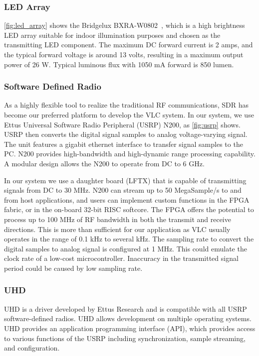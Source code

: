 \subsubsection{LED Array}
\autoref{fig:led_array} shows the Bridgelux BXRA-W0802~\cite{Bridgelux}, which is a high brightness LED array suitable for indoor illumination purposes and chosen as the transmitting LED component. The maximum DC forward current is 2 amps, and the typical forward voltage is around 13 volts, resulting in a maximum output power of 26 W. Typical luminous flux with 1050 mA forward is 850 lumen.

\subsubsection{Software Defined Radio}
As a highly flexible tool to realize the traditional RF communications, SDR has become our preferred platform to develop the VLC system. In our system, we use Ettus Universal Software Radio Peripheral (USRP) N200, as \autoref{fig:usrp} shows. USRP then converts the digital signal samples to analog voltage-varying signal.
The unit features a gigabit ethernet interface to transfer signal samples to the PC. 
N200 provides high-bandwidth and high-dynamic range processing capability. 
A modular design allows the N200 to operate from DC to 6 GHz. 

In our system we use a daughter board (LFTX) that is capable of transmitting signals from DC to 30 MHz. 
N200 can stream up to 50 MegaSample/s to and from host applications, and users can implement custom functions in the FPGA fabric, or in the on-board 32-bit RISC softcore. The FPGA offers the potential to process up to 100 MHz of RF bandwidth in both the transmit and receive directions. 
This is more than sufficient for our application as VLC usually operates in the range of 0.1 kHz to several kHz. The sampling rate to convert the digital samples to analog signal is configured at 1 MHz. This could emulate the clock rate of a low-cost microcontroller. Inaccuracy in the transmitted signal period could be caused by low sampling rate.

\subsubsection{UHD}
UHD is a driver developed by Ettus Research and is compatible with all USRP software-defined radios. 
UHD allows development on multiple operating systems.
UHD provides an application programming interface (API), which provides access to various functions of the USRP including synchronization, sample streaming, and configuration. 

